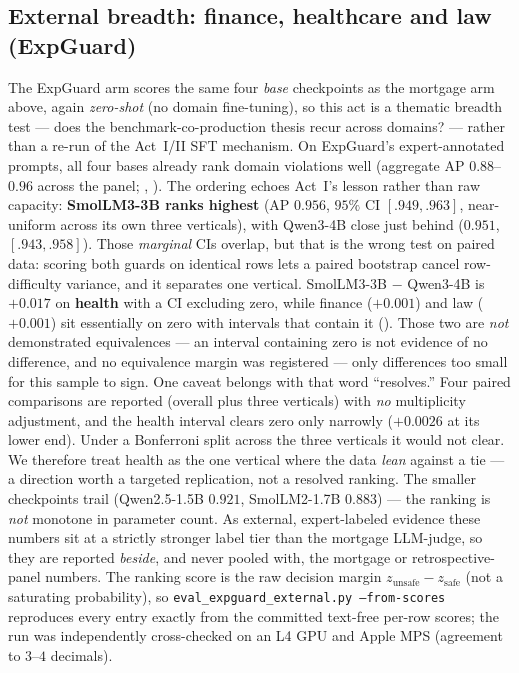 \documentclass[11pt]{article}
\newcommand{\code}[1]{\texttt{\small #1}}
\begin{document}
\subsection{External breadth: finance, healthcare and law (ExpGuard)}
\label{sec:actIV-expguard}
\noindent The ExpGuard arm scores the same four \emph{base} checkpoints as the mortgage arm above,
again \emph{zero-shot} (no domain fine-tuning), so this act is a thematic breadth test --- does the
benchmark-co-production thesis recur across domains? --- rather than a re-run of the Act~I/II SFT
mechanism. On ExpGuard's expert-annotated prompts, all four bases already rank domain violations well
(aggregate AP $0.88$--$0.96$ across the panel; , ). The
ordering echoes Act~I's lesson rather than raw capacity: \textbf{SmolLM3-3B ranks highest} (AP $0.956$,
$95\%$ CI $[.949,.963]$, near-uniform across its own three verticals), with Qwen3-4B close
just behind ($0.951$, $[.943,.958]$). Those \emph{marginal} CIs overlap, but that is the wrong test on
paired data: scoring both guards on identical rows lets a paired bootstrap cancel row-difficulty
variance, and it separates one vertical. SmolLM3-3B $-$ Qwen3-4B is $+0.017$ on \textbf{health} with a CI
excluding zero, while finance ($+0.001$) and law ($+0.001$) sit essentially on zero with intervals that
contain it (). Those two are \emph{not} demonstrated equivalences --- an interval
containing zero is not evidence of no difference, and no equivalence margin was registered --- only
differences too small for this sample to sign. One caveat belongs with that word ``resolves.'' Four paired
comparisons are reported (overall plus three verticals) with \emph{no} multiplicity adjustment, and the
health interval clears zero only narrowly ($+0.0026$ at its lower end). Under a Bonferroni split across
the three verticals it would not clear. We therefore treat health as the one vertical where the data
\emph{lean} against a tie --- a direction worth a targeted replication, not a resolved ranking. The smaller checkpoints trail (Qwen2.5-1.5B $0.921$,
SmolLM2-1.7B $0.883$) --- the ranking is \emph{not} monotone in parameter count.
As external, expert-labeled evidence these numbers sit at a strictly stronger label tier than the mortgage
LLM-judge, so they are reported \emph{beside}, and never pooled with, the mortgage or retrospective-panel
numbers. The ranking score is the raw decision margin $z_{\text{unsafe}}-z_{\text{safe}}$ (not a saturating
probability), so \code{eval\_expguard\_external.py --from-scores} reproduces every entry exactly from the
committed text-free per-row scores; the run was independently cross-checked on an L4 GPU and Apple MPS
(agreement to $3$--$4$ decimals).
\end{document}
